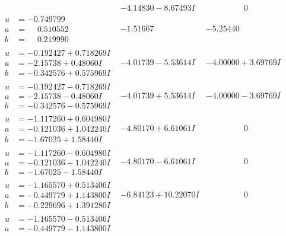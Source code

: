 \documentclass[1p]{elsarticle_modified}
\theoremstyle{definition}
\begin{document}
$$\begin{array}{c|c|c}
 & -4.14830 - 8.67493 I & \phantom{-0.000000 } 0 \\ \hline\begin{aligned}
u &= -0.749799\phantom{ +0.000000I} \\
a &= \phantom{-}0.510552\phantom{ +0.000000I} \\
b &= \phantom{-}0.219990\phantom{ +0.000000I}\end{aligned}
 & -1.51667\phantom{ +0.000000I} & -5.25440\phantom{ +0.000000I} \\ \hline\begin{aligned}
u &= -0.192427 + 0.718269 I \\
a &= -2.15738 + 0.48060 I \\
b &= -0.342576 + 0.575969 I\end{aligned}
 & -4.01739 - 5.53614 I & -4.00000 + 3.69769 I \\ \hline\begin{aligned}
u &= -0.192427 - 0.718269 I \\
a &= -2.15738 - 0.48060 I \\
b &= -0.342576 - 0.575969 I\end{aligned}
 & -4.01739 + 5.53614 I & -4.00000 - 3.69769 I \\ \hline\begin{aligned}
u &= -1.117260 + 0.604980 I \\
a &= -0.121036 + 1.042240 I \\
b &= -1.67025 + 1.58440 I\end{aligned}
 & -4.80170 + 6.61061 I & \phantom{-0.000000 } 0 \\ \hline\begin{aligned}
u &= -1.117260 - 0.604980 I \\
a &= -0.121036 - 1.042240 I \\
b &= -1.67025 - 1.58440 I\end{aligned}
 & -4.80170 - 6.61061 I & \phantom{-0.000000 } 0 \\ \hline\begin{aligned}
u &= -1.165570 + 0.513406 I \\
a &= -0.449779 + 1.143800 I \\
b &= -0.229696 + 1.391280 I\end{aligned}
 & -6.84123 + 10.22070 I & \phantom{-0.000000 } 0 \\ \hline\begin{aligned}
u &= -1.165570 - 0.513406 I \\
a &= -0.449779 - 1.143800 I \\

\end{aligned}
\end{array}$$
\end{document}
